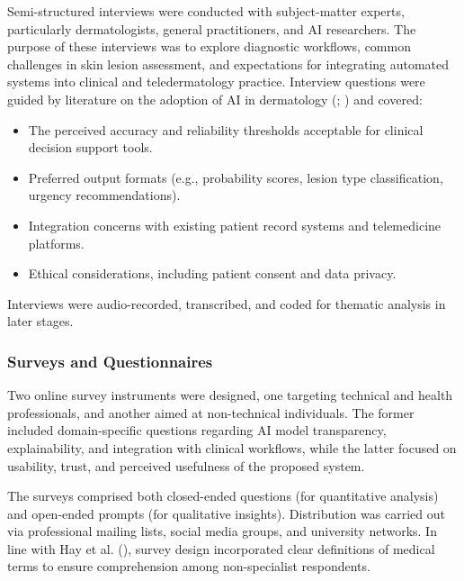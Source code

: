 \documentclass[
  12pt,
  oneside]{article}
\providecommand{\tightlist}{%
  \setlength{\itemsep}{0pt}\setlength{\parskip}{0pt}}
\begin{document}
Semi-structured interviews were conducted with subject-matter experts,
particularly dermatologists, general practitioners, and AI researchers.
The purpose of these interviews was to explore diagnostic workflows,
common challenges in skin lesion assessment, and expectations for
integrating automated systems into clinical and teledermatology
practice. Interview questions were guided by literature on the adoption
of AI in dermatology (; ) and
covered:

\begin{itemize}
\tightlist
\item
  The perceived accuracy and reliability thresholds acceptable for
  clinical decision support tools.
\item
  Preferred output formats (e.g., probability scores, lesion type
  classification, urgency recommendations).
\item
  Integration concerns with existing patient record systems and
  telemedicine platforms.
\item
  Ethical considerations, including patient consent and data privacy.
\end{itemize}

Interviews were audio-recorded, transcribed, and coded for thematic
analysis in later stages.

\subsubsection{Surveys and
Questionnaires}\label{surveys-and-questionnaires}

Two online survey instruments were designed, one targeting technical and
health professionals, and another aimed at non-technical individuals.
The former included domain-specific questions regarding AI model
transparency, explainability, and integration with clinical workflows,
while the latter focused on usability, trust, and perceived usefulness
of the proposed system.

The surveys comprised both closed-ended questions (for quantitative
analysis) and open-ended prompts (for qualitative insights).
Distribution was carried out via professional mailing lists, social
media groups, and university networks. In line with Hay et al.
(), survey design
incorporated clear definitions of medical terms to ensure comprehension
among non-specialist respondents.
\end{document}
